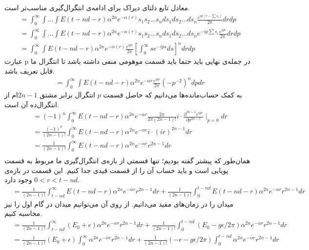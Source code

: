 معادل تابع دلتای دیراک برای ادامه‌ی انتگرال‌گیری مناسب‌تر است.
\begin{align}
	&= \int_{0}^{\infty}\int ... \int E(t - nd - r) \alpha^{2n} e^{-\alpha(r)} s_1 s_2 ... s_n ds_1 ds_2 ... ds_n \frac{e^{ip(r-\sum s_i)}}{2\pi} dr dp\\
	&= \int_{0}^{\infty}\int ... \int E(t - nd - r) \alpha^{2n} e^{-\alpha(r)} s_1 s_2 ... s_n ds_1 ds_2 ... ds_n e^{-ip\sum s_i} \frac{e^{ipr}}{2\pi} dr dp\\
	&= \int_{0}^{\infty}\int E(t - nd - r) \alpha^{2n} e^{-\alpha(r)} \frac{e^{ipr}}{2\pi} [\int_0^{\infty} s e^{-ips} ds]^n dr dp
\end{align}
عبارت p در جمله‌ی نهایی باید حتما باید قسمت موهومی منفی داشته باشد تا انتگرال ما قابل تعریف باشد.
\begin{align}
	&= \int_{0}^{\infty}\int E(t - nd - r) \alpha^{2n} e^{-\alpha r} \frac{e^{ipr}}{2\pi} (-p^{-2})^n dp dr
\end{align}
به کمک حساب‌مانده‌ها می‌دانیم که حاصل قسمت $p$ انتگرال برابر مشتق $ 2n-1 $ام از انتگرال‌ده آن است.
\begin{align}
	&= (-1)^n \int_{0}^{\infty} E(t - nd - r) \alpha^{2n} e^{-\alpha r} \frac{2\pi}{2\pi (2n-1)!} i \cdot \frac{\partial^{2n-1} e^{ipr}}{\partial p^{2n-1}}\mid_{p=0} dr\\
	&= \frac{(-1)^n}{(2n-1)!}\int_{0}^{\infty} E(t - nd - r) \alpha^{2n} e^{-\alpha r} i \cdot (ir)^{2n-1} dr\\
	&= \frac{1}{(2n-1)!} \int_{0}^{\infty} E(t - nd - r) \alpha^{2n} e^{-\alpha r} r^{2n-1} dr\\
\end{align}	
همان‌طور که پیشتر گفته بودیم؛ تنها قسمتی از بازه‌ی انتگرال‌گیری ما مربوط به قسمت پویایی است و باید حساب آن را از قسمت قیدی جدا کنیم. این قسمت در بازه‌ی 
$0 < r < t-nd$
وجود دارد.
\begin{align}
	&= \frac{1}{(2n-1)!} \int_{t-nd}^{\infty} E(t - nd - r) \alpha^{2n} e^{-\alpha r} r^{2n-1} dr + \frac{1}{(2n-1)!} \int_{0}^{t - nd}E(t - nd - r) \alpha^{2n} e^{-\alpha r} r^{2n-1} dr	
\end{align}
میدان را در زمان‌های مقید می‌دانیم. از روی آن می‌توانیم میدان در گام اول را نیز محاسبه کنیم.
\begin{align}
	&= \frac{1}{(2n-1)!} \int_{t-nd}^{\infty} (E_0 + \epsilon) \alpha^{2n} e^{-\alpha r} r^{2n-1} dr + \frac{1}{(2n-1)!} \int_{0}^{t - nd}(E_0 - g\epsilon/2\pi) \alpha^{2n} e^{-\alpha r} r^{2n-1} dr\\
	&= \frac{1}{(2n-1)!} (E_0 + \epsilon) \int_{0}^{\infty} \alpha^{2n} e^{-\alpha r} r^{2n-1} dr + \frac{1}{(2n-1)!} ( - \epsilon - g\epsilon/2\pi) \int_{0}^{t - nd} \alpha^{2n} e^{-\alpha r} r^{2n-1} dr	
\end{align}
